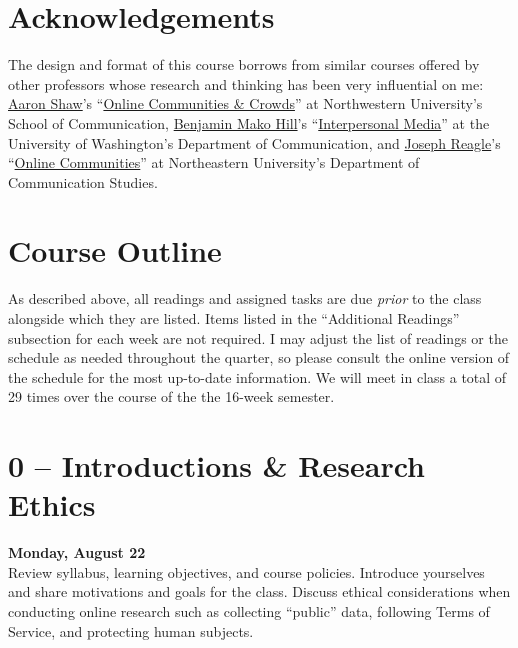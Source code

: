 \documentclass[11pt]{memoir}
\begin{document}
\section{Acknowledgements}
The design and format of this course borrows from similar courses offered by other professors whose research and thinking has been very influential on me: \href{http://aaronshaw.org/}{Aaron Shaw}'s ``\href{http://aaronshaw.org/teaching/2014/occ/syllabus/Shaw-occ-syllabus2014.pdf}{Online Communities \& Crowds}'' at Northwestern University's School of Communication, \href{https://mako.cc/academic/}{Benjamin Mako Hill}'s ``\href{http://wiki.communitydata.cc/Interpersonal_Media_(Fall_2015)}{Interpersonal Media}'' at the University of Washington's Department of Communication, and \href{http://reagle.org/joseph}{Joseph Reagle}'s ``\href{http://reagle.org/joseph/2014/oc/oc-syllabus-FA.html}{Online Communities}'' at Northeastern University's Department of Communication Studies.


\newpage
\section{\textbf{Course Outline}}

As described above, all readings and assigned tasks are due
\emph{prior} to the class alongside which they are listed. Items
listed in the ``Additional Readings'' subsection for each week are not
required. I may adjust the list of readings or the schedule as needed
throughout the quarter, so please consult the online version of the
schedule for the most up-to-date information. We will meet in class a total of 29 times over the course of the the 16-week semester.



\section{0 -- Introductions \& Research Ethics}
\textcolor{CUGold}{\textbf{Monday, August 22}}\\
Review syllabus, learning objectives, and course policies. Introduce yourselves and share motivations and goals for the class. Discuss ethical considerations when conducting online research such as collecting ``public'' data, following Terms of Service, and protecting human subjects.
\end{document}
